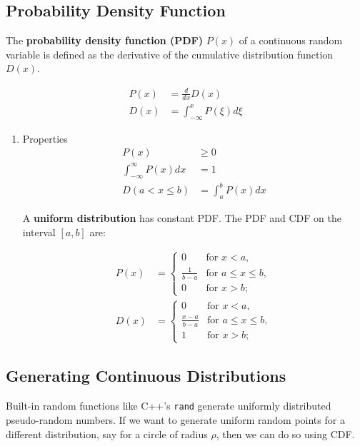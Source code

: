 \documentclass[11pt]{article}
\begin{document}
\subsection{Probability Density Function}
\label{sec:org770111a}
The \textbf{probability density function (PDF)} \(P\left( x \right)\) of a continuous random variable is defined as the derivative of the cumulative distribution function \(D\left( x \right)\).

\begin{align*}
    P\left( x \right) &= \frac{d}{dx}D\left( x \right) \\
    D\left( x \right) &= \int_{-\infty}^{x} P\left( \xi \right) d\xi
\end{align*}

\begin{enumerate}
\item Properties
\label{sec:org88880df}
 \begin{align*}
     P\left( x \right) &\geq 0 \\
     \int_{-\infty}^{\infty} P\left( x \right)dx &= 1 \\
     D\left( a < x \leq b \right) &= \int_{a}^{b} P\left( x \right)dx
\end{align*}

A \textbf{uniform distribution} has constant PDF. The PDF and CDF on the interval \(\left[ a,b \right]\) are:

\begin{align*}
    P\left( x \right) &= \begin{cases}
                             0 &\text{for } x < a, \\
                             \frac{1}{b - a} &\text{for } a \leq x \leq b, \\
                             0 &\text{for } x > b;
                         \end{cases} \\
    D\left( x \right) &= \begin{cases}
                             0 &\text{for } x < a, \\
                             \frac{x - a}{b - a} &\text{for } a \leq x \leq b, \\
                             1 &\text{for } x > b;
                         \end{cases}
\end{align*}
\end{enumerate}

\subsection{Generating Continuous Distributions}
\label{sec:orgb7798c4}
Built-in random functions like C++'s \texttt{rand} generate uniformly distributed pseudo-random numbers. If we want to generate uniform random points for a different distribution, say for a circle of radius \(\rho\), then we can do so using CDF.
\end{document}
